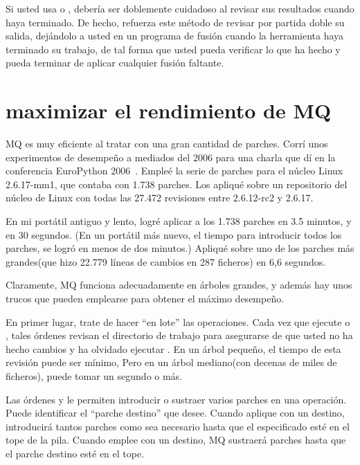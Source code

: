 Si usted usa  o , debería ser
doblemente cuidadoso al revisar sus resultados cuando haya terminado.
De hecho,  refuerza este método de revisar por partida
doble su salida, dejándolo a usted en un programa de fusión cuando la
herramienta haya terminado su trabajo, de tal forma que usted pueda
verificar lo que ha hecho y pueda terminar de aplicar cualquier fusión
faltante.

\section{maximizar el rendimiento de MQ}
\label{sec:mq:perf}

MQ es muy eficiente al tratar con una gran cantidad de parches.  Corrí
unos experimentos de desempeño a mediados del 2006 para una charla que
dí en la conferencia EuroPython 2006~\cite{web:europython}.  Empleé la
serie de parches para el núcleo Linux 2.6.17-mm1, que contaba con 1.738
parches.  Los apliqué sobre un repositorio del núcleo de Linux con
todas las 27.472 revisiones entre 2.6.12-rc2 y 2.6.17.

En mi portátil antiguo y lento, logré aplicar 
 a los 1.738 parches en 3.5
minutos, y  en 30 segundos.
(En un portátil más nuevo, el tiempo para introducir todos los
parches, se logró en menos de dos minutos.)  Apliqué
 sobre uno de los parches más grandes(que hizo
22.779 líneas de cambios en 287 ficheros) en 6,6 segundos.

Claramente, MQ funciona adecuadamente en árboles grandes, y además hay
unos trucos que pueden emplearse para obtener el máximo desempeño.

En primer lugar, trate de hacer ``en lote'' las operaciones.  Cada vez
que ejecute  o , tales órdenes
revisan el directorio de trabajo para asegurarse de que usted no ha
hecho cambios y ha olvidado ejecutar .  En un
árbol pequeño, el tiempo de esta revisión puede ser mínimo,  Pero en
un árbol mediano(con decenas de miles de ficheros), puede tomar un
segundo o más.

Las órdenes  y  le permiten
introducir o sustraer varios parches en una operación.  Puede
identificar el ``parche destino'' que desee.  Cuando aplique
 con un destino, introducirá tantos parches como sea
necesario hasta que el especificado esté en el tope de la pila.
Cuando emplee  con un destino, MQ sustraerá parches
hasta que el parche destino esté en el tope.

